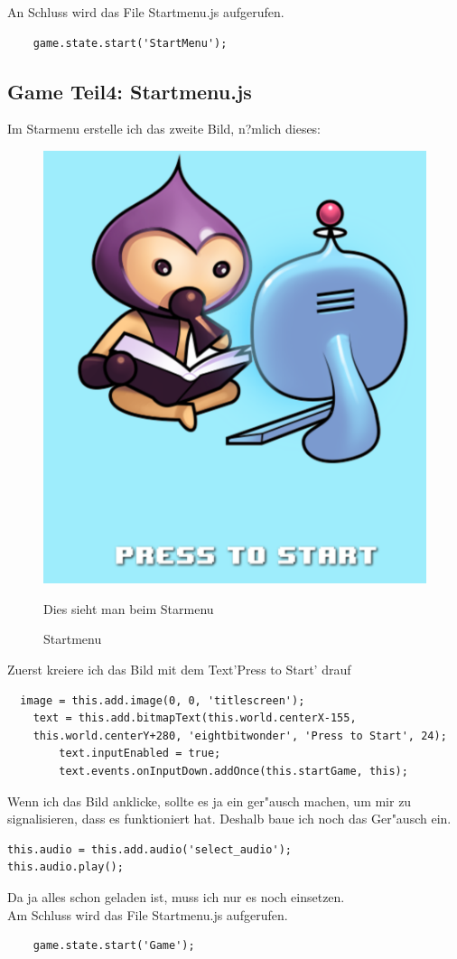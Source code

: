 \documentclass{article}
\begin{document}
An Schluss wird das File Startmenu.js aufgerufen.\\


\begin{lstlisting}
    game.state.start('StartMenu');
\end{lstlisting}

\cleardoublepage
\subsection{Game Teil4: Startmenu.js}

Im Starmenu erstelle ich das zweite Bild, n?mlich dieses:

\begin{figure}[ht]
    \centering
    \includegraphics[width=.3\linewidth]{foto}
    \caption{Startmenu}
    \label{fig:sub1}{Dies sieht man beim Starmenu}
    \end{figure}

Zuerst kreiere ich das Bild mit dem Text'Press to Start' drauf
\begin{lstlisting}
  image = this.add.image(0, 0, 'titlescreen');
    text = this.add.bitmapText(this.world.centerX-155,
    this.world.centerY+280, 'eightbitwonder', 'Press to Start', 24);
        text.inputEnabled = true;
        text.events.onInputDown.addOnce(this.startGame, this);
\end{lstlisting}

Wenn ich das Bild anklicke, sollte es ja ein ger"ausch machen, um mir zu signalisieren, dass es funktioniert hat.
Deshalb baue ich noch das Ger"ausch ein.

\begin{lstlisting}
this.audio = this.add.audio('select_audio');
this.audio.play();
\end{lstlisting}
Da ja alles schon geladen ist, muss ich nur es noch einsetzen.\\
Am Schluss wird das File Startmenu.js aufgerufen.\\

\begin{lstlisting}
    game.state.start('Game');
\end{lstlisting}
\end{document}
